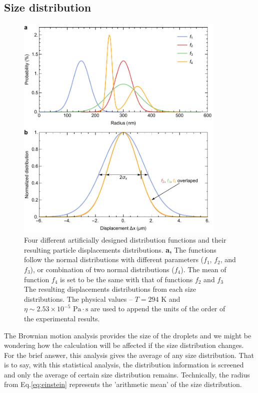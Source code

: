 \subsection{Size distribution}
\label{sec:ch2-4-3}

\begin{figure}[ht!]
\centering
\includegraphics[width=100mm]{figures/ch2/Brownian/distributionEffect.pdf}
\caption{Four different artificially designed distribution functions and their resulting particle displacements distributions. \textbf{a,} The functions follow the normal distributions with different parameters ($f_1$, $f_2$, and $f_3$), or combination of two normal distributions ($f_4$). The mean of function $f_4$ is set to be the same with that of functions $f_2$ and $f_3$  The resulting displacements distributions from each size distributions. The physical values -- $T=294 \text{ K}$ and $\eta \sim 2.53\times10^{-5} \text{ Pa}\cdot\text{s}$ are used to append the units of the order of the experimental results.}
\label{fig:distributionEffect}
\end{figure}

The Brownian motion analysis provides the size of the droplets and we might be wondering how the calculation will be affected if the size distribution changes. For the brief answer, this analysis gives the average of any size distribution. That is to say, with this statistical analysis, the distribution information is screened and only the average of certain size distribution remains. Technically, the radius from Eq.\ref{eq:einstein} represents the 'arithmetic mean' of the size distribution.

